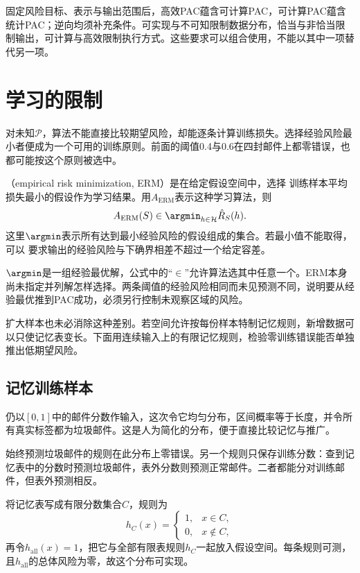 固定风险目标、表示与输出范围后，高效PAC蕴含可计算PAC，可计算PAC蕴含统计PAC；逆向均须补充条件。可实现与不可知限制数据分布，恰当与非恰当限制输出，可计算与高效限制执行方式。这些要求可以组合使用，不能以其中一项替代另一项。

\section{学习的限制}
\label{sec:limits-of-learning}

对未知$\mathcal P$，算法不能直接比较期望风险，却能逐条计算训练损失。选择经验风险最小者便成为一个可用的训练原则。前面的阈值0.4与0.6在四封邮件上都零错误，也都可能按这个原则被选中。

\begin{definition}[经验风险最小化]
\label{def:erm-learning-rule}
（empirical risk minimization, ERM）是在给定假设空间中，选择
训练样本平均损失最小的假设作为学习结果。用$A_{\mathrm{ERM}}$表示这种学习算法，则
\begin{equation}
 A_{\mathrm{ERM}}(S)\in\argmin_{h\in\mathcal H}\hat R_S(h).
 \label{eq:erm-learning-rule}
\end{equation}
这里$\argmin$表示所有达到最小经验风险的假设组成的集合。若最小值不能取得，可以
要求输出的经验风险与下确界相差不超过一个给定容差。
\end{definition}

$\argmin$是一组经验最优解，公式中的“$\in$”允许算法选其中任意一个。ERM本身尚未指定并列解怎样选择。两条阈值的经验风险相同而未见预测不同，说明要从经验最优推到PAC成功，必须另行控制未观察区域的风险。

扩大样本也未必消除这种差别。若空间允许按每份样本特制记忆规则，新增数据可以只使记忆表变长。下面用连续输入上的有限记忆规则，检验零训练错误能否单独推出低期望风险。

\subsection{记忆训练样本}

仍以$[0,1]$中的邮件分数作输入，这次令它均匀分布，区间概率等于长度，并令所有真实标签都为垃圾邮件。这是人为简化的分布，便于直接比较记忆与推广。

始终预测垃圾邮件的规则在此分布上零错误。另一个规则只保存训练分数：查到记忆表中的分数时预测垃圾邮件，表外分数则预测正常邮件。二者都能分对训练邮件，但表外预测相反。

将记忆表写成有限分数集合$C$，规则为
\begin{equation}
  h_C(x)=
  \begin{cases}
    1, & x\in C,\\
    0, & x\notin C,
  \end{cases}
  \label{eq:finite-memory-classifier}
\end{equation}
再令$h_{\mathrm{all}}(x)=1$，把它与全部有限表规则$h_C$一起放入假设空间。每条规则可测，且$h_{\mathrm{all}}$的总体风险为零，故这个分布可实现。

